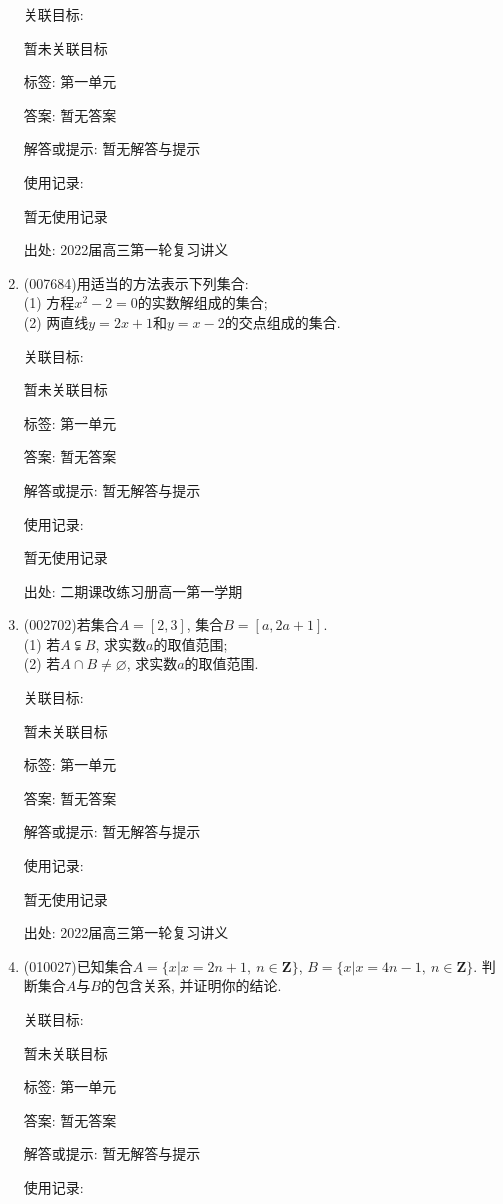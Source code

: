\documentclass[10pt,a4paper]{article}
\begin{document}
\begin{enumerate}[1.]
关联目标:

暂未关联目标



标签: 第一单元

答案: 暂无答案

解答或提示: 暂无解答与提示

使用记录:

暂无使用记录


出处: 2022届高三第一轮复习讲义
\item { (007684)}用适当的方法表示下列集合:\\
(1) 方程$x^2-2=0$的实数解组成的集合;\\
(2) 两直线$y=2x+1$和$y=x-2$的交点组成的集合.


关联目标:

暂未关联目标



标签: 第一单元

答案: 暂无答案

解答或提示: 暂无解答与提示

使用记录:

暂无使用记录


出处: 二期课改练习册高一第一学期
\item { (002702)}若集合$A=[2,3]$, 集合$B=[a,2a+1]$.\\
(1) 若$A\subsetneqq B$, 求实数$a$的取值范围;\\
(2) 若$A\cap B\ne \varnothing$, 求实数$a$的取值范围.


关联目标:

暂未关联目标



标签: 第一单元

答案: 暂无答案

解答或提示: 暂无解答与提示

使用记录:

暂无使用记录


出处: 2022届高三第一轮复习讲义
\item { (010027)}已知集合$A=\{x|x=2n+1,\ n\in \mathbf{Z}\}$, $B=\{x|x=4n-1,\ n\in \mathbf{Z}\}$. 判断集合$A$与$B$的包含关系, 并证明你的结论.


关联目标:

暂未关联目标



标签: 第一单元

答案: 暂无答案

解答或提示: 暂无解答与提示

使用记录:


\end{enumerate}
\end{document}
